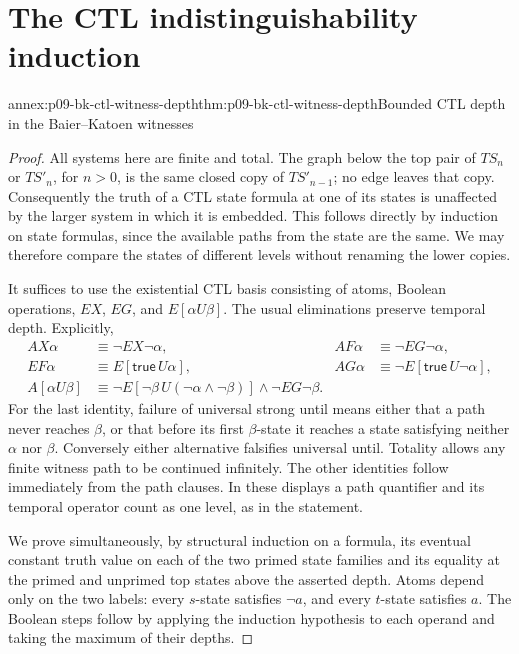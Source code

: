 \section{The CTL indistinguishability induction}
\label{sec:annex-p09-ctl-witnesses}

\begin{annexitem}{annex:p09-bk-ctl-witness-depth}{thm:p09-bk-ctl-witness-depth}{Bounded CTL depth in the Baier--Katoen witnesses}
\begin{proof}
All systems here are finite and total. The graph below the top pair
of \(TS_n\) or \(TS'_n\), for \(n>0\), is the same closed copy of
\(TS'_{n-1}\); no edge leaves that copy. Consequently the truth of
a CTL state formula at one of its states is unaffected by the larger
system in which it is embedded. This follows directly by induction
on state formulas, since the available paths from the state are the
same. We may therefore compare the states of different levels without
renaming the lower copies.

It suffices to use the existential CTL basis consisting of atoms,
Boolean operations, \(EX\), \(EG\), and \(E[\alpha U\beta]\).
The usual eliminations preserve temporal depth. Explicitly,
\[
\begin{aligned}
 AX\alpha&\equiv\neg EX\neg\alpha,
 &AF\alpha&\equiv\neg EG\neg\alpha,\\
 EF\alpha&\equiv E[\mathsf{true}\,U\alpha],
 &AG\alpha&\equiv\neg E[\mathsf{true}\,U\neg\alpha],\\
 A[\alpha U\beta]
 &\equiv\neg E[\neg\beta\,U(\neg\alpha\land\neg\beta)]
          \land\neg EG\neg\beta.
\end{aligned}
\]
For the last identity, failure of universal strong until means either
that a path never reaches \(\beta\), or that before its first
\(\beta\)-state it reaches a state satisfying neither \(\alpha\)
nor \(\beta\). Conversely either alternative falsifies universal
until. Totality allows any finite witness path to be continued
infinitely. The other identities follow immediately from the path
clauses. In these displays a path quantifier and its temporal operator
count as one level, as in the statement.

We prove simultaneously, by structural induction on a formula,
its eventual constant truth value on each of the two primed state
families and its equality at the primed and unprimed top states above
the asserted depth. Atoms depend only on the two labels: every
\(s\)-state satisfies \(\neg a\), and every \(t\)-state satisfies
\(a\). The Boolean steps follow by applying the induction hypothesis
to each operand and taking the maximum of their depths.


\end{proof}
\end{annexitem}
